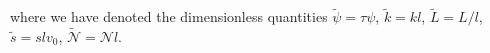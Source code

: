 \documentclass[pre,aps,superscriptaddress,nofootinbib]{revtex4}
\begin{document}
where we have denoted the dimensionless quantities $\tilde{\psi} = \tau \psi$, $\tilde{k} = k l$, $\tilde{L} = L/l$, $\tilde{s} = s l v_0$, $\tilde{\mathcal{N}} = \mathcal{N} l$.
%
\end{document}
